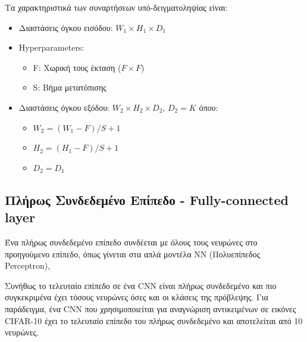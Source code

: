 Τα χαρακτηριστικά των συναρτήσεων υπό-δειγματοληψίας είναι:
\begin{itemize}
  \item{Διαστάσεις όγκου εισόδου: $W_{1} \times H_{1} \times D_{1}$}
  \item{Hyperparameters:}
    \begin{itemize}
      \item{F: Χωρική τους έκταση ($F \times F$)}
      \item{S: Βήμα μετατόπισης}
    \end{itemize}
  \item{Διαστάσεις όγκου εξόδου: $W_{2} \times H_{2} \times D_{2}$, $D_{2} = K$} όπου:
    \begin{itemize}
      \item{$W_{2} = (W_{1} - F)/S + 1$}
      \item{$H_{2} = (H_{1} - F)/S + 1$}
      \item{$D_{2} = D_{1}$}
    \end{itemize}
\end{itemize}


\subsection{Πλήρως Συνδεδεμένο Επίπεδο - Fully-connected layer}

Ένα πλήρως συνδεδεμένο επίπεδο συνδέεται με όλους τους νευρώνες στο
προηγούμενο επίπεδο, όπως γίνεται στα απλά μοντέλα NN (Πολυεπίπεδος Perceptron),

Συνήθως το τελευταίο επίπεδο σε ένα CNN είναι πλήρως συνδεδεμένο και πιο
συγκεκριμένα έχει τόσους νευρώνες όσες και οι κλάσεις της πρόβλεψης. Για
παράδειγμα, ένα CNN που χρησιμοποιείται για αναγνώριση αντικειμένων σε
εικόνες CIFAR-10 έχει το τελευταίο επίπεδο του πλήρως συνδεδεμένο και %
αποτελείται από 10 νευρώνες.
